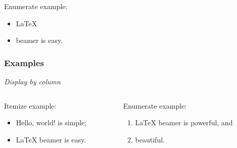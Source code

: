 \documentclass{beamer}
\begin{document}
\begin{frame}
  \begin{exampleblock}{Enumerate example:}
    \begin{itemize}
    \item \LaTeX{}
    \item beamer is easy.
    \end{itemize}    
  \end{exampleblock}
\end{frame}


\begin{frame}\frametitle{Examples}
  \emph{Display by column}
  \begin{columns}
    \begin{column}{.5\textwidth}
      \begin{example}
        Itemize example:
        \begin{itemize}
        \item Hello, world! is simple;
        \item \LaTeX{} beamer is easy.
        \end{itemize}
      \end{example}
    \end{column}
    \begin{column}{.5\textwidth}
      \begin{exampleblock}{Enumerate example:}
        \begin{enumerate}
        \item \LaTeX{} beamer is powerful, and
        \item beautiful.
        \end{enumerate}
      \end{exampleblock}
    \end{column}
  \end{columns}
\end{frame}
\end{document}
